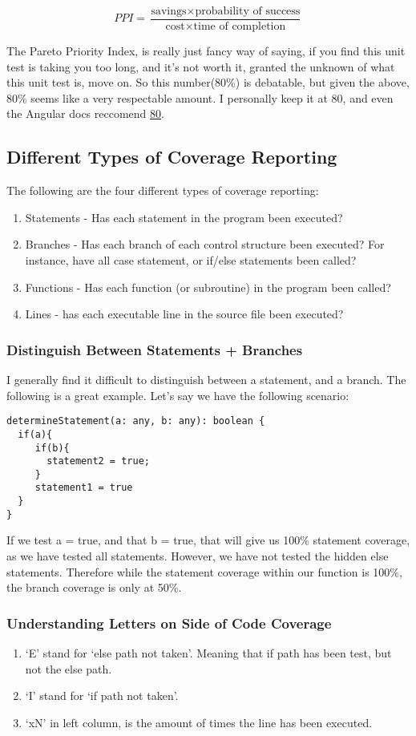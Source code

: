 \[
PPI = \frac{\text{savings} \times \text{probability of success}}
           {\text{cost} \times \text{time of completion}}
\]

The Pareto Priority Index, is really just fancy way of saying, if you find this
unit test is taking you too long, and it's not worth it, granted the unknown
of what this unit test is, move on. So this number(80\%) is debatable, but given
the above, 80\% seems like a very respectable amount. I personally keep it at
80, and even the Angular docs reccomend \href{https://github.com/angular/angular-cli/wiki/stories-code-coverage}{80}.

\subsection{ Different Types of Coverage Reporting }
The following are the four different types of coverage reporting:
\begin{enumerate}
  \item Statements - Has each statement in the program been executed?
  \item Branches - Has each branch of each control structure been executed? For
  instance, have all case statement, or if/else statements been called?
  \item Functions - Has each function (or subroutine) in the program been called?
  \item Lines - has each executable line in the source file been executed?
\end{enumerate}

\subsubsection{Distinguish Between Statements + Branches}
I generally find it difficult to distinguish between a statement, and a
branch. The following is a great example. Let's say we have the following
scenario:
\begin{lstlisting}
determineStatement(a: any, b: any): boolean {
  if(a){
     if(b){
       statement2 = true;
     }
     statement1 = true
  }
}
\end{lstlisting}

If we test a = true, and that b = true, that will give us 100\% statement
coverage, as we have tested all statements. However, we have not tested the
hidden else statements. Therefore while the statement coverage within our
function is 100\%, the branch coverage is only at 50\%.

\subsubsection{Understanding Letters on Side of Code Coverage}
\begin{enumerate}
  \item `E' stand for `else path not taken'. Meaning that if path has been test,
  but not the else path.
  \item `I' stand for `if path not taken'.
  \item `xN' in left column, is the amount of times the line has been executed.
\end{enumerate}

